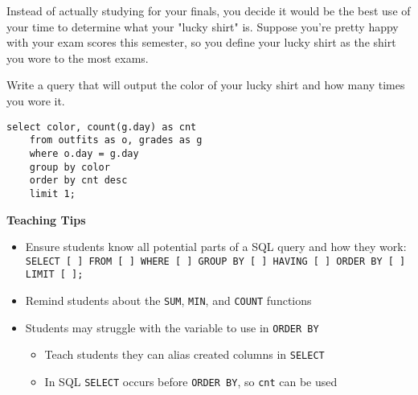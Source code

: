\begin{blocksection}
\question
Instead of actually studying for your finals, you decide it would be the best use of your time to determine what your "lucky shirt" is. Suppose you're pretty happy with your exam scores this semester, so you define your lucky shirt as the shirt you wore to the most exams.

Write a query that will output the color of your lucky shirt and how many times you wore it.

\begin{solution}[1.5in]
\begin{lstlisting}
select color, count(g.day) as cnt
    from outfits as o, grades as g
    where o.day = g.day
    group by color
    order by cnt desc
    limit 1;
\end{lstlisting}
\end{solution}
\end{blocksection}

\begin{guide}
\begin{blocksection}
\textbf{Teaching Tips}
\begin{itemize}
  \item Ensure students know all potential parts of a SQL query and how they work:
  \\\lstinline{SELECT [ ] FROM [ ] WHERE [ ] GROUP BY [ ] HAVING [ ] ORDER BY [ ] LIMIT [ ];}
  \item Remind students about the \lstinline{SUM}, \lstinline{MIN}, and \lstinline{COUNT} functions
  \item Students may struggle with the variable to use in \lstinline{ORDER BY}
  \begin{itemize}
    \item Teach students they can alias created columns in \lstinline{SELECT}
    \item In SQL \lstinline{SELECT} occurs before \lstinline{ORDER BY}, so \lstinline{cnt} can be used
  \end{itemize}
\end{itemize}
\end{blocksection}
\end{guide}
